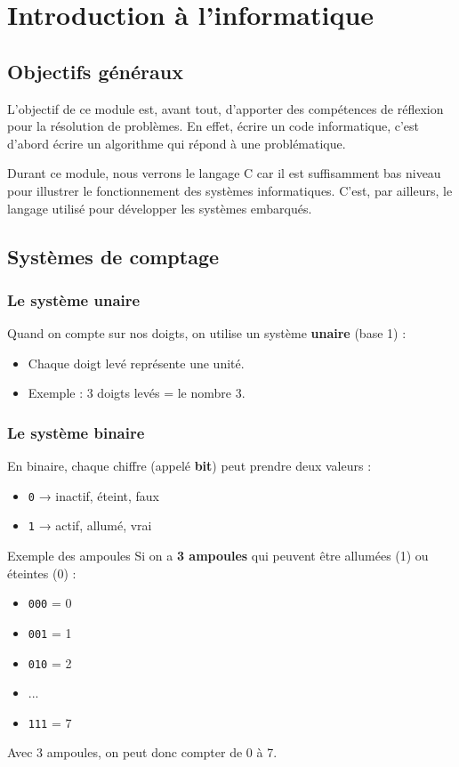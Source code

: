 
\section{Introduction à l’informatique}
\subsection{Objectifs généraux}

L'objectif de ce module est, avant tout, d'apporter des compétences de réflexion pour la résolution de problèmes. En effet, écrire un code informatique, c'est d'abord écrire un algorithme qui répond à une problématique.

Durant ce module, nous verrons le langage C car il est suffisamment bas niveau pour illustrer le fonctionnement des systèmes informatiques. C'est, par ailleurs, le langage utilisé pour développer les systèmes embarqués.


\subsection{Systèmes de comptage}
\subsubsection{Le système unaire}

Quand on compte sur nos doigts, on utilise un système \textbf{unaire} (base 1) :
\begin{itemize}
	\item Chaque doigt levé représente une unité.
	\item Exemple : 3 doigts levés = le nombre 3.
\end{itemize}

\subsubsection{Le système binaire}

En binaire, chaque chiffre (appelé \textbf{bit}) peut prendre deux valeurs :
\begin{itemize}
	\item \texttt{0} → inactif, éteint, faux
	\item \texttt{1} → actif, allumé, vrai
\end{itemize}

\begin{UPSTIinfor}{Exemple des ampoules}
	Si on a \textbf{3 ampoules} qui peuvent être allumées (1) ou éteintes (0) :
	\begin{itemize}
		\item \texttt{000} = 0
		\item \texttt{001} = 1
		\item \texttt{010} = 2
		\item ...
		\item \texttt{111} = 7
	\end{itemize}

	Avec 3 ampoules, on peut donc compter de 0 à 7.
\end{UPSTIinfor}

